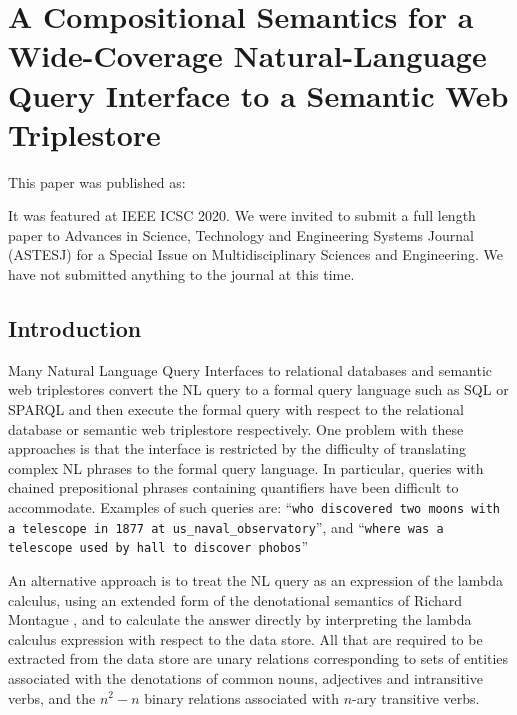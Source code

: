 \documentclass[../main.tex]{subfiles}
\begin{document}
\chapter{A Compositional Semantics for a Wide-Coverage Natural-Language Query Interface to a Semantic Web Triplestore}
\begin{refsection}

This paper was published as:


It was featured at IEEE ICSC 2020.  We were invited to submit a full length paper to Advances in Science, Technology and Engineering Systems Journal (ASTESJ) for a Special Issue on Multidisciplinary Sciences and Engineering.  We have not submitted anything to the journal at this time.


\label{chapter:icsc2020conf}


\section{Introduction}

Many Natural Language Query Interfaces to relational databases and semantic web triplestores
convert the NL query to a formal query language such as SQL or SPARQL and then execute the formal
query with respect to the relational database or semantic web triplestore respectively. One problem with
these approaches is that the interface is restricted by the difficulty of translating complex NL phrases to
the formal query language. In particular, queries with chained prepositional phrases containing
quantifiers have been difficult to accommodate. Examples of such queries are: ``\texttt{who discovered two
moons with a telescope in 1877 at us\_naval\_observatory}'', and ``\texttt{where was a telescope used by hall to discover phobos}''

An alternative approach is to treat the NL query as an expression of the lambda calculus, using an
extended form of the denotational semantics of Richard Montague \cite{Dowty:wall}, and to calculate the answer directly
by interpreting the lambda calculus expression with respect to the data store. All that are required to be
extracted from the data store are unary relations corresponding to sets of entities associated with the
denotations of common nouns, adjectives and intransitive verbs, and the $n^2 - n$ binary relations
associated with $n$-ary transitive verbs.


\end{refsection}
\end{document}
